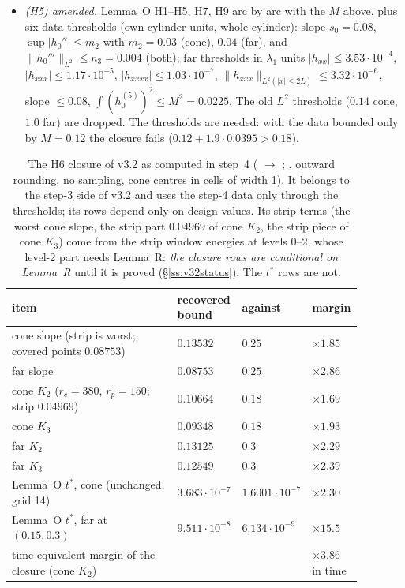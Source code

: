 \documentclass[11pt]{article}
\theoremstyle{definition}
\theoremstyle{remark}
\newcommand{\fn}[1]{\texttt{\detokenize{#1}}}
\newcommand{\abs}[1]{\lvert #1\rvert}
\newcommand{\norm}[1]{\lVert #1\rVert}
\begin{document}
\begin{itemize}
\item \emph{(H5) amended.} Lemma~O H1--H5, H7, H9 arc by arc with the $M$ above, plus six data thresholds (own cylinder units, whole cylinder): slope $s_0=0.08$, $\sup\abs{h_0''}\le m_2$ with $m_2=0.03$ (cone), $0.04$ (far), and $\norm{h_0'''}_{L^2}\le n_3=0.004$ (both); far thresholds in $\lambda_1$ units $\abs{h_{xx}}\le3.53\cdot10^{-4}$, $\abs{h_{xxx}}\le1.17\cdot10^{-5}$, $\abs{h_{xxxx}}\le1.03\cdot10^{-7}$, $\norm{h_{xxx}}_{L^2(\abs x\le2L)}\le3.32\cdot10^{-6}$, slope $\le0.08$, $\int(h_0^{(5)})^2\le M^2=0.0225$. The old $L^2$ thresholds ($0.14$ cone, $1.0$ far) are dropped. The thresholds are needed: with the data bounded only by $M=0.12$ the closure fails ($0.12+1.9\cdot0.0395>0.18$).
\end{itemize}

\begin{table}[htbp]\centering\small
\caption{The H6 closure of v3.2 as computed in step~4 (\fn{p2/t9_h6_v32.py} $\to$ \fn{t9_h6_v32.json}; \fn{arb}, outward rounding, no sampling, cone centres in cells of width 1). It belongs to the step-3 side of v3.2 and uses the step-4 data only through the thresholds; its rows depend only on design values. Its strip terms (the worst cone slope, the strip part $0.04969$ of cone $K_2$, the strip piece of cone $K_3$) come from the strip window energies at levels 0--2, whose level-2 part needs Lemma~R: \emph{the closure rows are conditional on Lemma~R} until it is proved (\S\ref{ss:v32status}). The $t^*$ rows are not.}\label{tab:v32}
\begin{tabular}{@{}L{0.52\linewidth}L{0.14\linewidth}L{0.10\linewidth}L{0.12\linewidth}@{}}\toprule
item & recovered bound & against & margin\\\midrule
cone slope (strip is worst; covered points $0.08753$) & $0.13532$ & $0.25$ & $\times1.85$\\
far slope & $0.08753$ & $0.25$ & $\times2.86$\\
cone $K_2$ ($r_c=380$, $r_p=150$; strip $0.04969$) & $0.10664$ & $0.18$ & $\times1.69$\\
cone $K_3$ & $0.09348$ & $0.18$ & $\times1.93$\\
far $K_2$ & $0.13125$ & $0.3$ & $\times2.29$\\
far $K_3$ & $0.12549$ & $0.3$ & $\times2.39$\\
Lemma~O $t^*$, cone (unchanged, grid 14) & $3.683\cdot10^{-7}$ & $1.6001\cdot10^{-7}$ & $\times2.30$\\
Lemma~O $t^*$, far at $(0.15,0.3)$ & $9.511\cdot10^{-8}$ & $6.134\cdot10^{-9}$ & $\times15.5$\\
time-equivalent margin of the closure (cone $K_2$) & & & $\times3.86$ in time\\\bottomrule
\end{tabular}\end{table}
\end{document}
